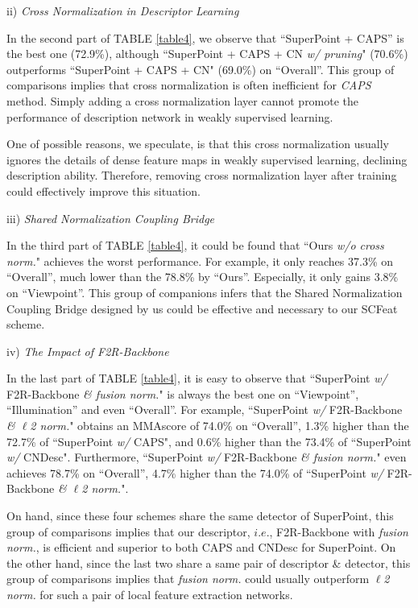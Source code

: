 \documentclass[journal]{IEEEtran}
\begin{document}
ii) \emph{Cross Normalization in Descriptor Learning}


In the second part of
TABLE \ref{table4}, we observe that ``SuperPoint + CAPS'' is the best one (72.9\%), although 
``SuperPoint + CAPS + CN \textit{w/ pruning}" (70.6\%) outperforms ``SuperPoint + CAPS + CN" (69.0\%) on ``Overall''. This group of comparisons implies that cross normalization is often inefficient for \emph{CAPS} method. Simply adding a cross normalization layer cannot promote the performance of description network in weakly supervised learning.

One of possible reasons, we speculate, is that this cross normalization usually ignores the details of dense feature maps in weakly supervised learning, declining description ability. Therefore, removing cross normalization layer after training could effectively improve this situation. 


iii) \emph{Shared Normalization Coupling Bridge} 

In the third part of TABLE \ref{table4}, it could be found that ``Ours \textit{w/o cross norm.}" achieves the worst performance. For example, it only reaches 37.3\% on ``Overall'', much lower than the 78.8\% by ``Ours''. Especially, it only gains 3.8\% on ``Viewpoint''. This group of companions infers that the Shared Normalization Coupling Bridge designed by us could be effective and necessary to our SCFeat scheme. 



iv) \emph{The Impact of F2R-Backbone}

In the last part of TABLE \ref{table4}, it is easy to observe that ``SuperPoint \textit{w/} F2R-Backbone \textit{\& fusion norm.}" is always the best one on ``Viewpoint'', ``Illumination'' and even ``Overall''. 
For example, 
``SuperPoint \textit{w/} F2R-Backbone \textit{\& $\ell$2 norm.}" obtains an MMAscore of 74.0\% on ``Overall'', 1.3\% higher than the 72.7\% of ``SuperPoint \textit{w/} CAPS", and 0.6\% higher than the 73.4\% of ``SuperPoint \textit{w/} CNDesc".
Furthermore, ``SuperPoint \textit{w/} F2R-Backbone \textit{\& fusion norm.}" even achieves 78.7\% on ``Overall'', 4.7\% higher 
than the 74.0\% of ``SuperPoint \textit{w/} F2R-Backbone \textit{\& $\ell$2 norm.}".

On hand, since these four schemes share the same detector of SuperPoint, this group of comparisons implies that our descriptor, $i.e.$, F2R-Backbone with \textit{fusion norm.}, is efficient and superior to both CAPS and CNDesc for SuperPoint.
On the other hand, since the last two share a same pair of descriptor \& detector, this group of comparisons implies that \textit{fusion norm.} could usually outperform \textit{$\ell$2 norm.} for such a pair of local feature extraction networks. 
\end{document}
